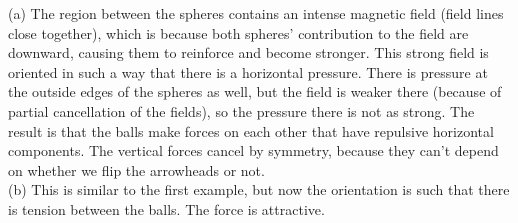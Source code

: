 (a) The region between the spheres contains an intense magnetic
field (field lines close together), which is because both spheres'
contribution to the field are downward, causing them to reinforce
and become stronger. This strong field is oriented
in such a way that there is a horizontal pressure. There is
pressure at the outside edges of the spheres as well, but the
field is weaker there (because of partial cancellation of the
fields), so the pressure there is not as strong. The result is
that the balls make forces on each other that have repulsive
horizontal components. The vertical forces cancel by symmetry,
because they can't depend on whether we flip the arrowheads
or not.\\
(b) This is similar to the first example, but now the orientation
is such that there is tension between the balls. The force is
attractive.
